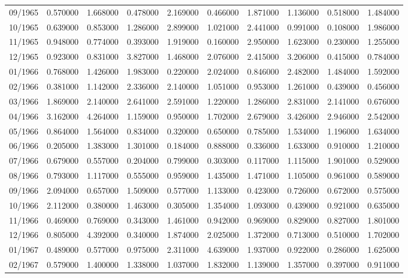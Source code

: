 \begin{tabular}{lrrrrrrrrr}
09/1965 & 0.570000 & 1.668000 & 0.478000 & 2.169000 & 0.466000 & 1.871000 & 1.136000 & 0.518000 & 1.484000 \\
10/1965 & 0.639000 & 0.853000 & 1.286000 & 2.899000 & 1.021000 & 2.441000 & 0.991000 & 0.108000 & 1.986000 \\
11/1965 & 0.948000 & 0.774000 & 0.393000 & 1.919000 & 0.160000 & 2.950000 & 1.623000 & 0.230000 & 1.255000 \\
12/1965 & 0.923000 & 0.831000 & 3.827000 & 1.468000 & 2.076000 & 2.415000 & 3.206000 & 0.415000 & 0.784000 \\
01/1966 & 0.768000 & 1.426000 & 1.983000 & 0.220000 & 2.024000 & 0.846000 & 2.482000 & 1.484000 & 1.592000 \\
02/1966 & 0.381000 & 1.142000 & 2.336000 & 2.140000 & 1.051000 & 0.953000 & 1.261000 & 0.439000 & 0.456000 \\
03/1966 & 1.869000 & 2.140000 & 2.641000 & 2.591000 & 1.220000 & 1.286000 & 2.831000 & 2.141000 & 0.676000 \\
04/1966 & 3.162000 & 4.264000 & 1.159000 & 0.950000 & 1.702000 & 2.679000 & 3.426000 & 2.946000 & 2.542000 \\
05/1966 & 0.864000 & 1.564000 & 0.834000 & 0.320000 & 0.650000 & 0.785000 & 1.534000 & 1.196000 & 1.634000 \\
06/1966 & 0.205000 & 1.383000 & 1.301000 & 0.184000 & 0.888000 & 0.336000 & 1.633000 & 0.910000 & 1.210000 \\
07/1966 & 0.679000 & 0.557000 & 0.204000 & 0.799000 & 0.303000 & 0.117000 & 1.115000 & 1.901000 & 0.529000 \\
08/1966 & 0.793000 & 1.117000 & 0.555000 & 0.959000 & 1.435000 & 1.471000 & 1.105000 & 0.961000 & 0.589000 \\
09/1966 & 2.094000 & 0.657000 & 1.509000 & 0.577000 & 1.133000 & 0.423000 & 0.726000 & 0.672000 & 0.575000 \\
10/1966 & 2.112000 & 0.380000 & 1.463000 & 0.305000 & 1.354000 & 1.093000 & 0.439000 & 0.921000 & 0.635000 \\
11/1966 & 0.469000 & 0.769000 & 0.343000 & 1.461000 & 0.942000 & 0.969000 & 0.829000 & 0.827000 & 1.801000 \\
12/1966 & 0.805000 & 4.392000 & 0.340000 & 1.874000 & 2.025000 & 1.372000 & 0.713000 & 0.510000 & 1.702000 \\
01/1967 & 0.489000 & 0.577000 & 0.975000 & 2.311000 & 4.639000 & 1.937000 & 0.922000 & 0.286000 & 1.625000 \\
02/1967 & 0.579000 & 1.400000 & 1.338000 & 1.037000 & 1.832000 & 1.139000 & 1.357000 & 0.397000 & 0.911000 \\

\end{tabular}

